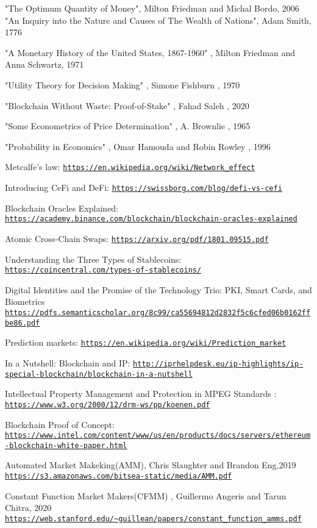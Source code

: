 \documentclass{article}
\begin{document}
\clearpage
\begin{thebibliography}{9}
"The Optimum Quantity of Money", Milton Friedman and Michal Bordo, 2006
"An Inquiry into the Nature and Causes of The Wealth of Nations", Adam Smith, 1776

"A Monetary History of the United States, 1867-1960" , Milton Friedman and Anna Schwartz, 1971

"Utility Theory for Decision Making" , Simone Fishburn , 1970

"Blockchain Without Waste: Proof-of-Stake" , Fahad Saleh , 2020

"Some Econometrics of Price Determination" , A.  Brownlie , 1965

"Probability in Economics" , Omar Hamouda and Robin Rowley , 1996
 
Metcalfe’s law: \texttt{\url{https://en.wikipedia.org/wiki/Network_effect}}

Introducing CeFi and DeFi: \texttt{\url{https://swissborg.com/blog/defi-vs-cefi}}

Blockchain Oracles Explained: \texttt{\url{https://academy.binance.com/blockchain/blockchain-oracles-explained}}

Atomic Cross-Chain Swaps: \texttt{\url{https://arxiv.org/pdf/1801.09515.pdf}}

Understanding the Three Types of Stablecoins: \texttt{\url{https://coincentral.com/types-of-stablecoins/}}

Digital Identities and the Promise of the Technology Trio:
PKI, Smart Cards, and Biometrics \texttt{\url{https://pdfs.semanticscholar.org/8c99/ca55694812d2832f5c6cfed06b0162ffbe86.pdf}}

Prediction markets: \texttt{\url{https://en.wikipedia.org/wiki/Prediction_market}}

In a Nutshell: Blockchain and IP: \texttt{\url{http://iprhelpdesk.eu/ip-highlights/ip-special-blockchain/blockchain-in-a-nutshell}}

Intellectual Property Management and Protection in MPEG Standards : \texttt{\url{https://www.w3.org/2000/12/drm-ws/pp/koenen.pdf}}

Blockchain Proof of Concept: \texttt{\url{https://www.intel.com/content/www/us/en/products/docs/servers/ethereum-blockchain-white-paper.html}}

Automated Market Makeking(AMM), Chris Slaughter and Brandon Eng,2019  \texttt{\url{https://s3.amazonaws.com/bitsea-static/media/AMM.pdf}}

Constant Function Market Makers(CFMM) , Guillermo Angeris and Tarun Chitra, 2020 \texttt{\url{https://web.stanford.edu/~guillean/papers/constant_function_amms.pdf}}
\end{thebibliography}
\end{document}
